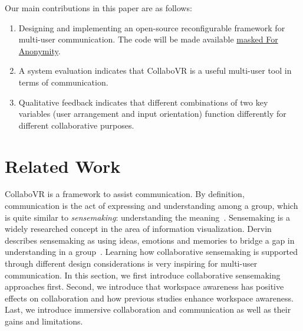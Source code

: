 \documentclass{sigchi}
\begin{document}
Our main contributions in this paper are as follows:
\begin{enumerate}
    \item Designing and implementing an open-source reconfigurable framework for multi-user communication. The code will be made available \url{masked For Anonymity}.
    \item A system evaluation indicates that CollaboVR is a useful multi-user tool in terms of communication.
    \item Qualitative feedback indicates that different combinations of two key variables (user arrangement and input orientation) function differently for different collaborative purposes.
\end{enumerate}


\section{Related Work}
CollaboVR is a framework to assist communication. By definition, communication is the act of expressing and understanding among a group, which is quite similar to \textit{sensemaking}: understanding the meaning~\cite{paul2009understanding}. Sensemaking is a widely researched concept in the area of information visualization. Dervin describes sensemaking as using ideas, emotions and memories to bridge a gap in understanding in a group~\cite{dervin1992mind}. Learning how collaborative sensemaking is supported through different design considerations is very inspiring for multi-user communication. In this section, we first introduce collaborative sensemaking approaches first. Second, we introduce that workspace awareness has positive effects on collaboration and how previous studies enhance workspace awareness. Last, we introduce immersive collaboration and communication as well as their gains and limitations.
\end{document}
